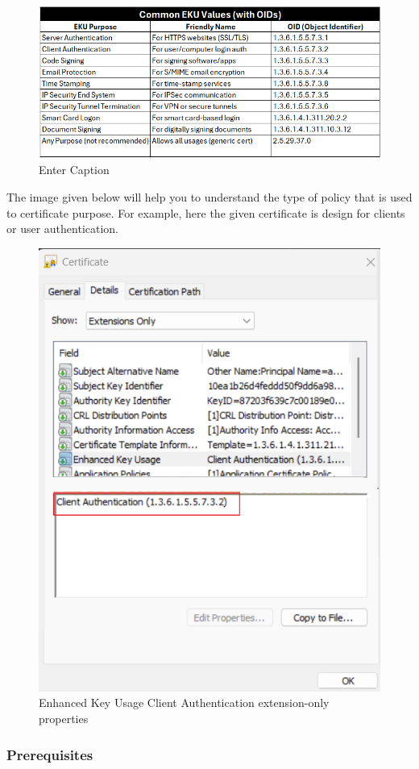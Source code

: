 \begin{figure}
    \centering
    \includegraphics[width=0.75\linewidth]{policies.png}
    \caption{Enter Caption}
    \label{fig:placeholder}
\end{figure}

The image given below will help you to understand the type of policy that is used to certificate purpose. For example, here the given certificate is design for clients or user authentication.

\begin{figure}
    \centering
    \includegraphics[width=0.75\linewidth]{eku.png}
    \caption{Enhanced Key Usage Client Authentication extension-only properties}
\end{figure}

\subsubsection{Prerequisites}

